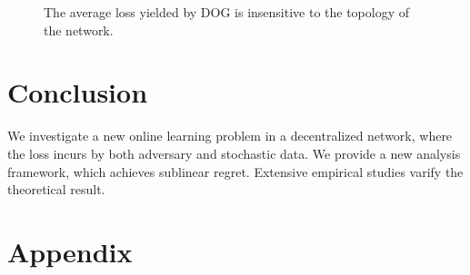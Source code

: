 \documentclass{article}
\begin{document}
\begin{figure}[!h]
\caption{The average loss yielded by DOG is insensitive to the topology of the network.}
\label{figure_compare_topology}
\end{figure}



\section{Conclusion}
We investigate a new online learning problem in a decentralized network, where the loss incurs by both adversary and stochastic data.  We provide a new analysis framework, which achieves sublinear regret. Extensive empirical studies varify the theoretical result. 






\onecolumn

\section*{Appendix}
\end{document}
